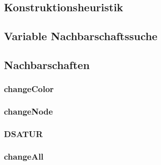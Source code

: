 \subsection{Konstruktionsheuristik}

\subsection{Variable Nachbarschaftssuche}

\subsection{Nachbarschaften}

\subsubsection{changeColor}
\subsubsection{changeNode}
\subsubsection{DSATUR}
\subsubsection{changeAll}


 
